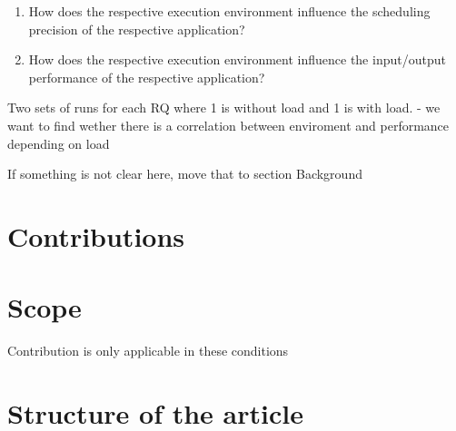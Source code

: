 \begin{enumerate}[label=\textbf{RQ\arabic*}]
	\item How does the respective execution environment influence the scheduling precision of the respective application?
	\item How does the respective execution environment influence the input/output performance of the respective application?\\
\end{enumerate}





Two sets of runs for each RQ where 1 is without load and 1 is with load. 
- we want to find wether there is a correlation between enviroment and performance depending on load

If something is not clear here, move that to section Background

\section{Contributions}

\section{Scope}
Contribution is only applicable in these conditions

\section{Structure of the article}